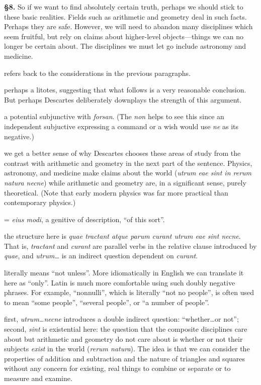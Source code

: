 \prenotes

\textbf{§8.} So if we want to find absolutely certain truth, perhaps we should stick to these basic realities. Fields such as arithmetic and geometry deal in such facts. Perhaps they are safe. However, we will need to abandon many disciplines which seem fruitful, but rely on claims about higher-level objects---things we can no longer be certain about. The disciplines we must let go include astronomy and medicine.

 refers back to the considerations in the previous paragraphs.

 perhaps a litotes, suggesting that what follows is a very reasonable conclusion. But perhaps Descartes deliberately downplays the strength of this argument.

 a potential subjunctive with \textit{forsan}. (The \textit{non} helps to see this since an independent subjuctive expressing a command or a wish would use \textit{ne} as its negative.)

 we get a better sense of why Descartes chooses these areas of study from the contrast with arithmetic and geometry in the next part of the sentence. Physics, astronomy, and medicine make claims about the world (\textit{utrum eae sint in rerum natura necne}) while arithmetic and geometry are, in a significant sense, purely theoretical. (Note that early modern physics was far more practical than contemporary physics.)

 = \textit{eius modi}, a genitive of description, ``of this sort''.

 the structure here is \textit{quae tractant atque parum curant utrum eae sint necne}. That is, \textit{tractant} and \textit{curant} are parallel verbs in the relative clause introduced by \textit{quae}, and \textit{utrum\dots} is an indirect question dependent on \textit{curant}.

 literally means ``not unless''. More idiomatically in English we can translate it here as ``only''. Latin is much more comfortable using such doubly negative phrases. For example, ``nonnulli'', which is literally ``not no people'', is often used to mean ``some people'', ``several people'', or ``a number of people''.

 first, \textit{utrum\dots necne} introduces a double indirect question: ``whether\dots or not''; second, \textit{sint} is existential here: the question that the composite disciplines care about but arithmetic and geometry do not care about is whether or not their subjects \textit{exist} in the world (\textit{rerum natura}). The idea is that we can consider the properties of addition and subtraction and the nature of triangles and squares without any concern for existing, real things to combine or separate or to measure and examine.

